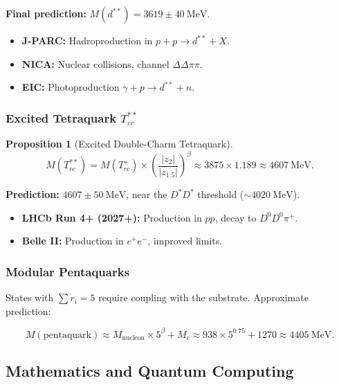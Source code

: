\documentclass[11pt, a4paper]{article}
\theoremstyle{plain}
\newtheorem{proposition}[theorem]{Proposition}
\theoremstyle{definition}
\begin{document}
\textbf{Final prediction:} $M(d^{**}) = 3619 \pm 40\ \si{\mega\electronvolt}$.

\begin{itemize}
    \item \textbf{J-PARC:} Hadroproduction in $p + p \to d^{**} + X$.
    \item \textbf{NICA:} Nuclear collisions, channel $\Delta\Delta\pi\pi$.
    \item \textbf{EIC:} Photoproduction $\gamma + p \to d^{**} + n$.
\end{itemize}

\subsubsection{Excited Tetraquark \texorpdfstring{$T_{cc}^{**}$}{Tcc**}}

\begin{proposition}[Excited Double-Charm Tetraquark]
\begin{equation}
M(T_{cc}^{**}) = M(T_{cc}^+) \times \left(\frac{|z_2|}{|z_{1.5}|}\right)^\beta \approx 3875 \times 1.189 \approx 4607\ \si{\mega\electronvolt}.
\end{equation}
\end{proposition}

\textbf{Prediction:} $4607 \pm 50\ \si{\mega\electronvolt}$, near the $D^*D^*$ threshold ($\sim 4020\ \si{\mega\electronvolt}$).

\begin{itemize}
    \item \textbf{LHCb Run 4+ (2027+):} Production in $pp$, decay to $D^0D^0\pi^+$.
    \item \textbf{Belle II:} Production in $e^+e^-$, improved limits.
\end{itemize}

\subsubsection{Modular Pentaquarks}

States with $\sum r_i = 5$ require coupling with the substrate. Approximate prediction:

\begin{equation}
M(\text{pentaquark}) \approx M_{\text{nucleon}} \times 5^\beta + M_c \approx 938 \times 5^{0.75} + 1270 \approx 4405\ \si{\mega\electronvolt}.
\end{equation}

\subsection{Mathematics and Quantum Computing}
\end{document}
